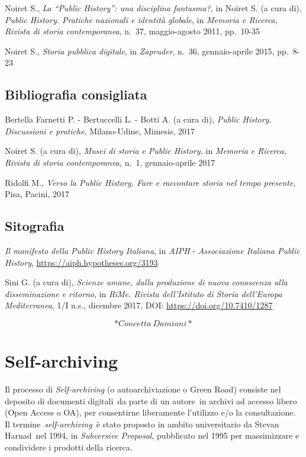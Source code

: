 \documentclass[
  b5paper,
  twoside,
  12pt,
  chapterprefix=false,
  bibliography=totocnumbered,
  parskip=false]{scrbook}
\begin{document}
Noiret S., \emph{La \enquote{Public History}: una disciplina fantasma?,} in Noiret S.
(a cura di), \emph{Public History. Pratiche nazionali e identità globale}, in
\emph{Memoria e Ricerca, Rivista di storia contemporanea}, n.~37,
maggio-agosto 2011, pp.~10-35

Noiret S., \emph{Storia pubblica digitale}, in \emph{Zapruder}, n.~36,
gennaio-aprile 2015, pp.~8-23

\hypertarget{bibliografia-consigliata-21}{%
\section*{Bibliografia consigliata}\label{bibliografia-consigliata-21}}

Bertella Farnetti P. - Bertuccelli L. - Botti A. (a cura di), \emph{Public
History. Discussioni e pratiche}, Milano-Udine, Mimesis, 2017

Noiret S. (a cura di), \emph{Musei di storia e Public History,} in \emph{Memoria e
Ricerca, Rivista di storia contemporanea,} n.~1, gennaio-aprile 2017

Ridolfi M., \emph{Verso la Public History. Fare e raccontare storia nel tempo
presente}, Pisa, Pacini, 2017

\hypertarget{sitografia-28}{%
\section*{Sitografia}\label{sitografia-28}}

\emph{Il manifesto della Public History Italiana}, in \emph{AIPH} - \emph{Associazione
Italiana Public History},
\url{https://aiph.hypotheses.org/3193}

Sini G. (a cura di), \emph{Scienze umane, dalla produzione di nuova
conoscenza alla disseminazione e ritorno}, in \emph{RiMe. Rivista
dell'Istituto di Storia dell'Europa Mediterranea}, 1/I n.s., dicembre
2017, DOI:
\url{https://doi.org/10.7410/1287}

\[*Concetta~Damiani*\]

\hypertarget{self-archiving}{%
\chapter{Self-archiving}\label{self-archiving}}

Il processo di \emph{Self-archiving} (o autoarchiviazione o Green Road)
consiste nel deposito di documenti digitali~da parte di un autore~in
archivi ad accesso libero (Open Access o OA), per consentirne
liberamente l'utilizzo e/o la consultazione. Il
termine~\emph{self-archiving}~è stato proposto in ambito universitario da
Stevan Harnad~nel 1994, in \emph{Subversive Proposal}, pubblicato nel 1995
per massimizzare e condividere i prodotti della ricerca.
\end{document}

